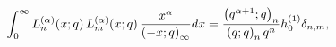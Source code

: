 \[\int_{0}^{\infty}\mathop{L^{(\alpha)}_{n}\/}\nolimits\!\left(x;q\right)\mathop%
{L^{(\alpha)}_{m}\/}\nolimits\!\left(x;q\right)\frac{x^{\alpha}}{\left(-x;q%
\right)_{\infty}}dx=\frac{\left(q^{\alpha+1};q\right)_{n}}{\left(q;q\right)_{n%
}q^{n}}h_{0}^{(1)}\delta_{n,m},\]